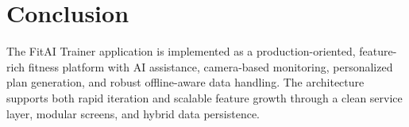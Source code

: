 \documentclass[12pt,a4paper]{article}
\begin{document}
\section{Conclusion}
The FitAI Trainer application is implemented as a production-oriented, feature-rich fitness platform with AI assistance, camera-based monitoring, personalized plan generation, and robust offline-aware data handling. The architecture supports both rapid iteration and scalable feature growth through a clean service layer, modular screens, and hybrid data persistence.
\end{document}
